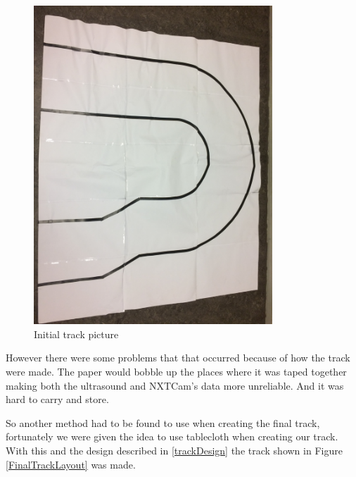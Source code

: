\begin{figure}[H]
    \centering
    \includegraphics[width=0.8\textwidth]{Images/Tracks/initialTrack.jpg}
    \caption{Initial track picture}
    \label{initalTraclLayout}
\end{figure}

However there were some problems that that occurred because of how the track were made. The paper would bobble up the places where it was taped together making both the ultrasound and NXTCam's data more unreliable. And it was hard to carry and store.

So another method had to be found to use when creating the final track, fortunately we were given the idea to use tablecloth when creating our track. With this and the design described in \ref{trackDesign} the track shown in Figure \ref{FinalTrackLayout} was made.

